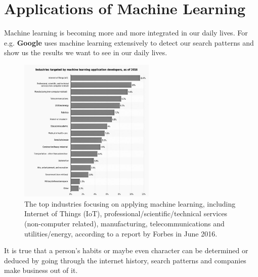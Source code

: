 \chapter{Applications of Machine Learning}

Machine learning is becoming more and more integrated in our daily lives. For e.g. \textbf{Google} uses machine learning extensively to detect our search patterns and show us the results we want to see in our daily lives. 

\begin{figure}
\vspace{-25pt}
  \begin{center}
    \includegraphics[width=0.58\textwidth]{machine_learning_target.jpg}
  \end{center}
  \vspace{-30pt}
  \caption{The top industries focusing on applying machine learning, including Internet of Things (IoT), professional/scientific/technical services (non-computer related), manufacturing, telecommunications and utilities/energy, according to a report by Forbes in June 2016.}
  \vspace{-30pt}
\end{figure}

It is true that a person's habits or maybe even character can be determined or deduced by going through the internet history, search patterns and companies make business out of it.

